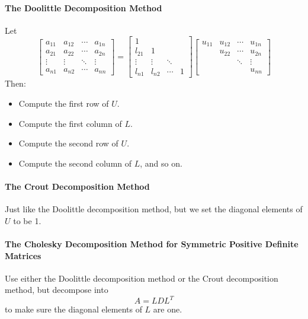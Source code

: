 \documentclass{matharticle}
\begin{document}
\paragraph{The Doolittle Decomposition Method}
Let
\begin{equation}
	\begin{bmatrix}
		a_{11} & a_{12} & \cdots & a_{1n} \\
		a_{21} & a_{22} & \cdots & a_{2n} \\
		\vdots & \vdots & \ddots & \vdots \\
		a_{n1} & a_{n2} & \cdots & a_{nn}
	\end{bmatrix} = \begin{bmatrix}
		1      &        &        &   \\
		l_{21} & 1      &        &   \\
		\vdots & \vdots & \ddots &   \\
		l_{n1} & l_{n2} & \cdots & 1
	\end{bmatrix} \begin{bmatrix}
		u_{11} & u_{12} & \cdots & u_{1n} \\
		       & u_{22} & \cdots & u_{2n} \\
		       &        & \ddots & \vdots \\
		       &        &        & u_{nn}
	\end{bmatrix}
\end{equation}
Then:
\begin{itemize}
	\item Compute the first row of $U$.
	\item Compute the first column of $L$.
	\item Compute the second row of $U$.
	\item Compute the second column of $L$, and so on.
\end{itemize}

\paragraph{The Crout Decomposition Method}
Just like the Doolittle decomposition method, but we set the diagonal elements of $U$ to be 1.

\paragraph{The Cholesky Decomposition Method for Symmetric Positive Definite Matrices}
Use either the Doolittle decomposition method or the Crout decomposition method, but decompose into
\begin{equation}
	A = LDL^T
\end{equation}
to make sure the diagonal elements of $L$ are one.
\end{document}
